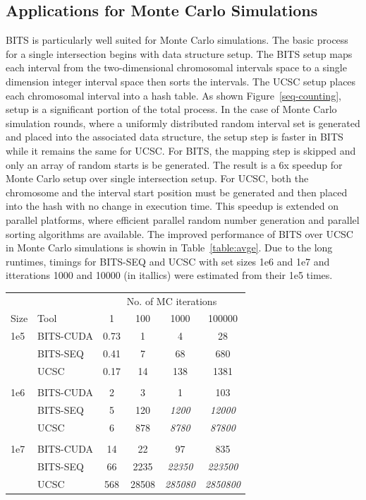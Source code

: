 \documentclass{bioinfo}
\begin{document}
\subsection{Applications for Monte Carlo Simulations}

BITS is particularly well suited for Monte Carlo simulations.  The basic process
for a single intersection begins with data structure setup.  The BITS setup maps
each interval from the two-dimensional chromosomal intervals space to a single
dimension integer interval space then sorts the intervals.  The UCSC setup
places each chromosomal interval into a hash table.  As shown
Figure~\ref{seq-counting}, setup is a significant portion of the total process.
In the case of Monte Carlo simulation rounds, where a uniformly distributed
random interval set is generated and placed into the associated data structure,
the setup step is faster in BITS while it remains the same for UCSC.  For BITS,
the mapping step is skipped and only an array of random starts is be generated.
The result is a 6x speedup for Monte Carlo setup over single intersection setup.
For UCSC, both the chromosome and the interval start position must be generated
and then placed into the hash with no change in execution time.  This speedup is
extended on parallel platforms, where efficient parallel random number
generation and parallel sorting algorithms are available.  The improved
performance of BITS over UCSC in Monte Carlo simulations is showin in
Table~\ref{table:avge}.  Due to the long runtimes, timings for BITS-SEQ and UCSC
with set sizes 1e6 and 1e7 and itterations 1000 and 10000 (in itallics) were
estimated from their 1e5 times.

\begin{center}
	\begin{tabular}{l l c c c c}
	\multicolumn{2}{c}{} & \multicolumn{4}{c}{No. of MC iterations} \\
	\cline{3-6}
	Size & Tool & 1 & 100 & 1000 & 100000 \\
	\hline
	\hline
	1e5 & BITS-CUDA & 0.73 & 1  & 4   & 28 \\
		& BITS-SEQ  & 0.41 & 7  & 68  & 680 \\
		& UCSC      & 0.17 & 14 & 138 & 1381 \\
	\\
	1e6 & BITS-CUDA & 2 & 3    & 1       & 103 \\
		& BITS-SEQ  & 5 & 120  & \emph{1200} & \emph{12000} \\
		& UCSC      & 6 & 878  & \emph{8780} & \emph{87800} \\
	\\
	1e7 & BITS-CUDA & 14  & 22    & 97            & 835 \\
		& BITS-SEQ  & 66  & 2235  & \emph{22350}  & \emph{223500} \\
		& UCSC      & 568 & 28508 & \emph{285080} & \emph{2850800} \\
	
	\hline
	\end{tabular}
\end{center}
\label{table:avge}
\end{document}
